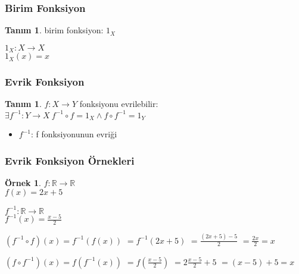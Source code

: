 \documentclass[dvipsnames]{beamer}
\theoremstyle{definition}
\newtheorem{tanim}[theorem]{Tanım}
\theoremstyle{example}
\newtheorem{ornek}[theorem]{Örnek}
\theoremstyle{plain}
\begin{document}
\begin{frame}
  \frametitle{Birim Fonksiyon}

  \begin{tanim}
    \alert{birim fonksiyon}: $1_X$

    \medskip
    $1_X: X \rightarrow X$\\
    $1_X(x) = x$
  \end{tanim}
\end{frame}

\begin{frame}
  \frametitle{Evrik Fonksiyon}

  \begin{tanim}
    $f: X \rightarrow Y$ fonksiyonu \alert{evrilebilir}:\\
      $\exists f^{-1}: Y \rightarrow X~f^{-1} \circ f = 1_X \wedge f \circ f^{-1} = 1_Y$

    \begin{itemize}
      \item $f^{-1}$: f fonksiyonunun \alert{evriği}
    \end{itemize}
  \end{tanim}
\end{frame}

\begin{frame}
  \frametitle{Evrik Fonksiyon Örnekleri}

  \begin{ornek}
    $f: \mathbb{R} \rightarrow \mathbb{R}$\\
    $f(x) = 2x + 5$

    \pause
    \bigskip
    $f^{-1}: \mathbb{R} \rightarrow \mathbb{R}$\\
    $f^{-1}(x) = \frac{x - 5}{2}$

    \pause
    \bigskip
    $(f^{-1} \circ f)(x) = f^{-1}(f(x))$
    \pause
    $ = f^{-1}(2x + 5)$
    \pause
    $ = \frac{(2x + 5) - 5}{2}$
    \pause
    $ = \frac{2x}{2} = x$
    \medskip

    \pause
    $(f \circ f^{-1})(x) = f(f^{-1}(x))$
    \pause
    $ = f(\frac{x - 5}{2})$
    \pause
    $ = 2 \frac{x - 5}{2} + 5$
    \pause
    $ = (x - 5) + 5 = x$
  \end{ornek}
\end{frame}
\end{document}
